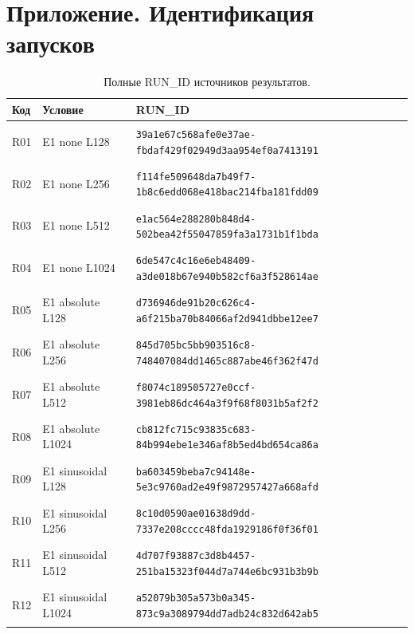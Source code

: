 \section*{Приложение. Идентификация запусков}
\begingroup\small{}
\begin{longtable}{@{}l>{\raggedright\arraybackslash}p{3.5cm}p{10.8cm}@{}}
\caption{Полные RUN\_ID источников результатов.}\\
\toprule Код & Условие & RUN\_ID \\ \midrule \endhead
\hypertarget{R01}{R01} & E1 none L128 & {\fontsize{8.8}{11}\selectfont\texttt{39a1e67c568afe0e37ae-fbdaf429f02949d3aa954ef0a7413191}} \\
\hypertarget{R02}{R02} & E1 none L256 & {\fontsize{8.8}{11}\selectfont\texttt{f114fe509648da7b49f7-1b8c6edd068e418bac214fba181fdd09}} \\
\hypertarget{R03}{R03} & E1 none L512 & {\fontsize{8.8}{11}\selectfont\texttt{e1ac564e288280b848d4-502bea42f55047859fa3a1731b1f1bda}} \\
\hypertarget{R04}{R04} & E1 none L1024 & {\fontsize{8.8}{11}\selectfont\texttt{6de547c4c16e6eb48409-a3de018b67e940b582cf6a3f528614ae}} \\
\hypertarget{R05}{R05} & E1 absolute L128 & {\fontsize{8.8}{11}\selectfont\texttt{d736946de91b20c626c4-a6f215ba70b84066af2d941dbbe12ee7}} \\
\hypertarget{R06}{R06} & E1 absolute L256 & {\fontsize{8.8}{11}\selectfont\texttt{845d705bc5bb903516c8-748407084dd1465c887abe46f362f47d}} \\
\hypertarget{R07}{R07} & E1 absolute L512 & {\fontsize{8.8}{11}\selectfont\texttt{f8074c189505727e0ccf-3981eb86dc464a3f9f68f8031b5af2f2}} \\
\hypertarget{R08}{R08} & E1 absolute L1024 & {\fontsize{8.8}{11}\selectfont\texttt{cb812fc715c93835c683-84b994ebe1e346af8b5ed4bd654ca86a}} \\
\hypertarget{R09}{R09} & E1 sinusoidal L128 & {\fontsize{8.8}{11}\selectfont\texttt{ba603459beba7c94148e-5e3c9760ad2e49f9872957427a668afd}} \\
\hypertarget{R10}{R10} & E1 sinusoidal L256 & {\fontsize{8.8}{11}\selectfont\texttt{8c10d0590ae01638d9dd-7337e208cccc48fda1929186f0f36f01}} \\
\hypertarget{R11}{R11} & E1 sinusoidal L512 & {\fontsize{8.8}{11}\selectfont\texttt{4d707f93887c3d8b4457-251ba15323f044d7a744e6bc931b3b9b}} \\
\hypertarget{R12}{R12} & E1 sinusoidal L1024 & {\fontsize{8.8}{11}\selectfont\texttt{a52079b305a573b0a345-873c9a3089794dd7adb24c832d642ab5}} \\

\end{longtable}
